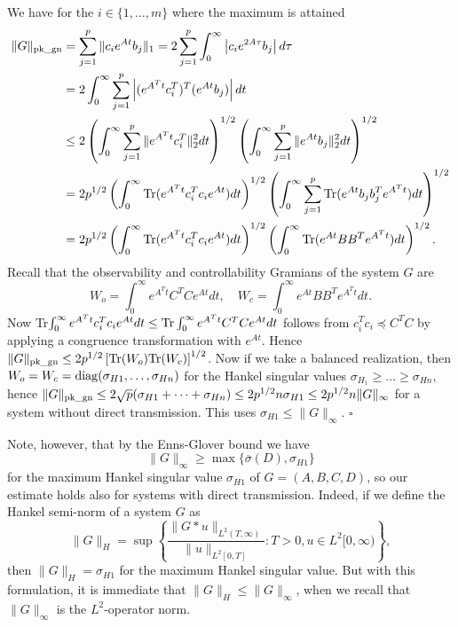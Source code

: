 \documentclass[12pt, a4paper,reqno]{amsart}
\renewenvironment{proof}{\noindent {\bf Proof: }}{\rm\\}
\theoremstyle{definition}
\begin{document}
\begin{proof}
We have for the $i\in \{1,\dots,m\}$ where the maximum is attained
\begin{align*}
\|G\|_{\rm pk\_gn} &= \sum_{j=1}^p \|c_i e^{At} b_j\|_1 
= 2 \sum_{j=1}^p \int_0^\infty  \left|c_i e^{2A\tau} b_j \right| d\tau \\
&=
2 \int_0^\infty \sum_{j=1}^p \left| (e^{{A^T}t} c_i^T)^T(e^{At}b_j) \right| dt\\
&\leq 2 \left(\int_0^\infty \sum_{j=1}^p \|e^{{A^T} t}c_i^T\|_2^2 dt\right)^{1/2} 
\left( \int_0^\infty \sum_{j=1}^p  \|e^{At}b_j\|_2^2 dt  \right)^{1/2}\\
&= 2p^{1/2} \left( \int_0^\infty  {\rm Tr}( e^{A^Tt}c_i^Tc_ie^{At}) dt \right)^{1/2} \left(  \int_0^\infty \sum_{j=1}^p {\rm Tr} (e^{At}b_jb_j^Te^{A^Tt}) dt\right)^{1/2}\\ 
&= 2 {p}^{1/2}  \left( \int_0^\infty {\rm Tr}( e^{A^Tt}c_i^Tc_ie^{At}) dt \right)^{1/2}
\left(  \int_0^\infty  {\rm Tr} (e^{At}BB^Te^{A^Tt}) dt\right)^{1/2}.%
%
\end{align*} 
%
Recall that
the observability and controllability Gramians of the system $G$
are
$$
W_o = \int_0^\infty e^{A^Tt}C^TC e^{At} dt, \quad W_c = \int_0^\infty e^{At} BB^Te^{A^Tt} dt.
$$
Now  Tr$\int_0^\infty e^{A^Tt}c_i^Tc_ie^{At} dt \leq {\rm Tr}\int_0^\infty e^{A^Tt}C^TCe^{At} dt$ 
follows from $c_i^Tc_i \preceq C^TC$ by applying a congruence
transformation with $e^{At}$.
Hence
$\|G\|_{\rm pk\_gn}  \leq 2{p}^{1/2}\left[ {\rm Tr}(W_o) {\rm Tr}(W_c) \right]^{1/2}$. Now
if we take a balanced realization, then $W_o=W_c = {\rm diag} (\sigma_{H1},\dots,\sigma_{Hn})$ for the Hankel singular
values $\sigma_{H_1} \geq \dots \geq \sigma_{Hn}$, hence 
$
\|G\|_{\rm pk\_gn} \leq 2\sqrt{p} (\sigma_{H1} + \dots + \sigma_{Hn})
\leq 2 p^{1/2} n \sigma_{H1} \leq 2p^{1/2}n \|G\|_\infty$
for a system without direct transmission. This uses $\sigma_{H1} \leq \|G\|_\infty$.
\hfill $\square$
\end{proof}


Note, however, that
by the Enns-Glover bound we have
$$
\|G\|_\infty \geq \max\{ \overline{\sigma}(D), \sigma_{H1}\}
$$
for the maximum Hankel singular value $\sigma_{H1}$ of $G=(A,B,C,D)$, so our estimate holds also for systems with direct transmission. 
Indeed, if we define the Hankel semi-norm of a system $G$ as
$$
\|G\|_H = \sup\left\{\frac{\|G\ast u\|_{L^2(T,\infty)}}{\|u\|_{L^2[0,T]}}: T > 0, u \in L^2[0,\infty)\right\},
$$
then $\|G\|_H = \sigma_{H1}$ for the maximum Hankel singular value. But with this formulation, it
is immediate  that $\|G\|_H \leq \|G\|_\infty$, when we recall that $\|G\|_\infty$ is the $L^2$-operator norm. 
\end{document}
